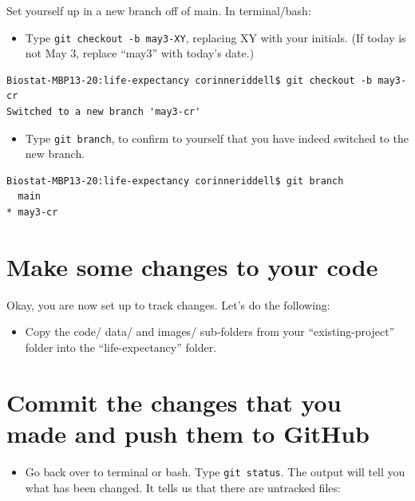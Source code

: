 \documentclass[
]{book}
\providecommand{\tightlist}{%
  \setlength{\itemsep}{0pt}\setlength{\parskip}{0pt}}
\begin{document}
Set yourself up in a new branch off of main. In terminal/bash:

\begin{itemize}
\tightlist
\item
  Type \texttt{git\ checkout\ -b\ may3-XY}, replacing XY with your initials. (If today
  is not May 3, replace ``may3'' with today's date.)
\end{itemize}

\begin{verbatim}
Biostat-MBP13-20:life-expectancy corinneriddell$ git checkout -b may3-cr
Switched to a new branch 'may3-cr'
\end{verbatim}

\begin{itemize}
\tightlist
\item
  Type \texttt{git\ branch}, to confirm to yourself that you have indeed switched to
  the new branch.
\end{itemize}

\begin{verbatim}
Biostat-MBP13-20:life-expectancy corinneriddell$ git branch
  main
* may3-cr
\end{verbatim}

\hypertarget{make-some-changes-to-your-code}{%
\section{Make some changes to your code}\label{make-some-changes-to-your-code}}

Okay, you are now set up to track changes. Let's do the following:

\begin{itemize}
\tightlist
\item
  Copy the code/ data/ and images/ sub-folders from your ``existing-project'' folder into the
  ``life-expectancy'' folder.
\end{itemize}

\hypertarget{commit-the-changes-that-you-made-and-push-them-to-github}{%
\section{Commit the changes that you made and push them to GitHub}\label{commit-the-changes-that-you-made-and-push-them-to-github}}

\begin{itemize}
\tightlist
\item
  Go back over to terminal or bash. Type \texttt{git\ status}. The output will tell you
  what has been changed. It tells us that there are untracked files:
\end{itemize}
\end{document}
